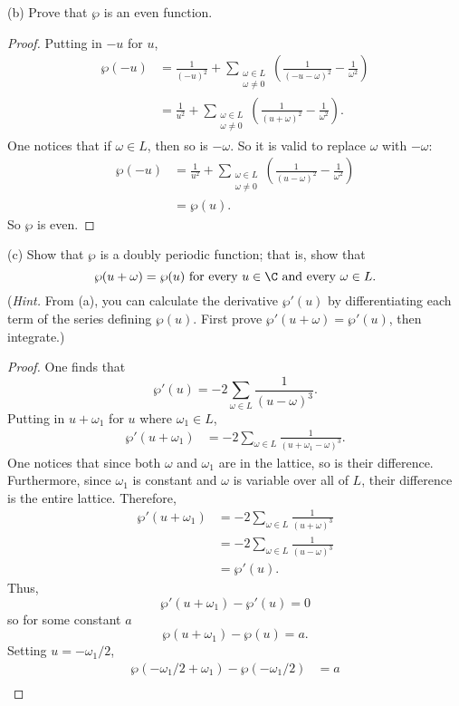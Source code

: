 \documentclass[11pt, oneside]{article}
\begin{document}
\begin{enumerate}
(b) Prove that $\wp$ is an even function.
\begin{proof}
Putting in $-u$ for $u$,
\begin{align*}
\wp (-u) &= \frac{1}{(-u)^2} + \sum_{\substack{\omega\in L\\\omega\neq 0}}\left(  \frac{1}{(-u-\omega)^2} - \frac{1}{\omega^2} \right)\\
&=\frac{1}{u^2} + \sum_{\substack{\omega\in L\\\omega\neq 0}}\left(  \frac{1}{(u+\omega)^2} - \frac{1}{\omega^2} \right).
\end{align*}
One notices that if $\omega\in L$, then so is $-\omega$. So it is valid to replace $\omega$ with $-\omega$:
\begin{align*}
\wp (-u) &= \frac{1}{u^2} + \sum_{\substack{\omega\in L\\\omega\neq 0}}\left(  \frac{1}{(u-\omega)^2} - \frac{1}{\omega^2} \right)\\
&=\wp(u).
\end{align*}
So $\wp$ is even.
\end{proof}
(c) Show that $\wp$ is a doubly periodic function; that is, show that
$$
\wp(u+\omega) = \wp(u) \textrm{ for every } u\in \C \textrm{ and every } \omega \in L.
$$
(\textit{Hint.} From (a), you can calculate the derivative $\wp'(u)$ by differentiating each term of the series defining $\wp(u)$. First prove $\wp ' (u+\omega) = \wp'(u)$, then integrate.)
\begin{proof}
One finds that
$$
\wp'(u) = -2\sum_{\omega\in L} \frac{1}{(u-\omega)^3}.
$$
Putting in $u+\omega_1$ for $u$ where $\omega_1\in L$,
\begin{align*}
\wp'(u+\omega_1) &= -2\sum_{\omega\in L} \frac{1}{(u+\omega_1-\omega)^3}.
\end{align*}
One notices that since both $\omega$ and $\omega_1$ are in the lattice, so is their difference. Furthermore, since $\omega_1$ is constant and $\omega$ is variable over all of $L$, their difference is the entire lattice. Therefore,
\begin{align*}
\wp'(u+\omega_1) &= -2\sum_{\omega\in L} \frac{1}{(u+\omega)^3}\\
				&=  -2\sum_{\omega\in L} \frac{1}{(u-\omega)^3}\\
				&= \wp'(u).
\end{align*}
Thus,
$$
\wp'(u+\omega_1) - \wp'(u) = 0
$$
so for some constant $a$
$$
\wp(u+\omega_1) - \wp(u) = a.
$$
Setting $u = -\omega_1/2$,
\begin{align*}
\wp(-\omega_1/2+\omega_1) - \wp(-\omega_1/2) &= a\\

\end{align*}
\end{proof}
\end{enumerate}
\end{document}
